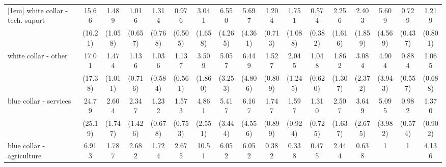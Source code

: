 {\begin{tabular}{l*{16}{c}}
[1em]
white collar - tech. suport&       15.66\sym{**} &       1.489         &       1.016         &       1.314         &       0.976         &       3.041\sym{*}  &       6.550\sym{**} &       5.697\sym{*}  &       1.204         &       1.751         &       0.574         &       2.256         &       2.403         &       5.609\sym{*}  &       0.729         &       1.219         \\
                    &     (16.21)         &     (1.058)         &     (0.657)         &     (0.768)         &     (0.505)         &     (1.658)         &     (4.265)         &     (4.361)         &     (0.713)         &     (1.088)         &     (0.382)         &     (1.616)         &     (1.859)         &     (4.569)         &     (0.437)         &     (0.801)         \\
[1em]
white collar - other&       17.01\sym{**} &       1.474         &       1.136         &       1.036         &       1.137         &       3.509\sym{*}  &       5.057\sym{*}  &       6.449\sym{*}  &       1.527         &       2.045         &       1.048         &       1.862         &       3.084         &       4.904\sym{*}  &       0.884         &       1.065         \\
                    &     (17.38)         &     (1.011)         &     (0.716)         &     (0.584)         &     (0.561)         &     (1.860)         &     (3.253)         &     (4.806)         &     (0.809)         &     (1.245)         &     (0.620)         &     (1.307)         &     (2.372)         &     (3.943)         &     (0.557)         &     (0.688)         \\
[1em]
blue collar - services&       24.79\sym{**} &       2.604         &       2.347         &       1.232         &       1.573         &       4.861\sym{**} &       5.417\sym{**} &       6.167\sym{*}  &       1.747         &       1.597         &       1.310         &       2.507         &       3.649         &       5.095\sym{*}  &       0.982         &       1.370         \\
                    &     (25.19)         &     (1.747)         &     (1.426)         &     (0.678)         &     (0.753)         &     (2.551)         &     (3.444)         &     (4.556)         &     (0.899)         &     (0.924)         &     (0.725)         &     (1.637)         &     (2.675)         &     (3.982)         &     (0.574)         &     (0.902)         \\
[1em]
blue collar - agriculture&       6.913         &       1.787         &       2.682         &       1.724         &       2.675         &       10.51\sym{***}&       6.052\sym{*}  &       6.052         &       0.382         &       0.338         &       0.475         &       2.444         &       0.638         &           1         &           1         &       4.136         \\

\end{tabular}}
